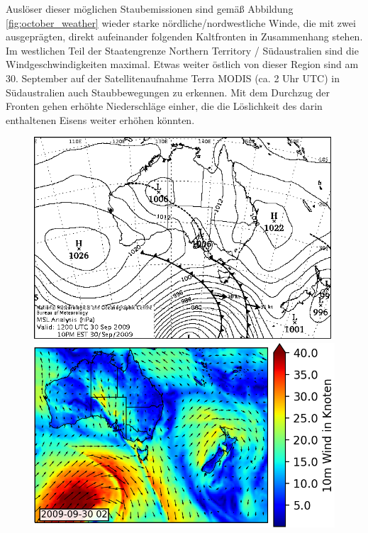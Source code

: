 \documentclass[12pt,a4paper,onecolumn]{scrartcl}
\begin{document}
Auslöser dieser möglichen Staubemissionen sind gemäß Abbildung \ref{fig:october_weather} wieder starke nördliche/nordwestliche Winde, die mit zwei ausgeprägten, direkt aufeinander folgenden Kaltfronten in Zusammenhang stehen. Im westlichen Teil der Staatengrenze Northern Territory / Südaustralien sind die Windgeschwindigkeiten maximal. Etwas weiter östlich von dieser Region sind am 30. September auf der Satellitenaufnahme Terra MODIS (ca. 2 Uhr UTC) in Südaustralien auch Staubbewegungen zu erkennen. Mit dem Durchzug der Fronten gehen erhöhte Niederschläge einher, die die Löslichkeit des darin enthaltenen Eisens weiter erhöhen könnten. 
\begin{figure}[!htb]
	\begin{minipage}[c]{0.3\textwidth}
		\includegraphics[width=\textwidth]{bilder/20090930T12_msl.png}
	\end{minipage}\hfill
	\begin{minipage}[c]{0.35\textwidth}
		\includegraphics[width=\textwidth]{bilder/wind_october_small.png}

\end{minipage}
\end{figure}
\end{document}
